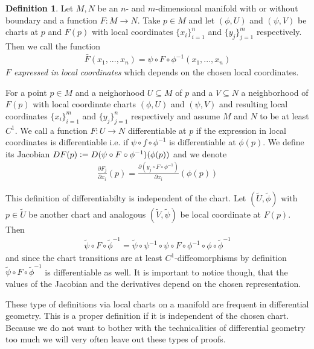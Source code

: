 \documentclass[12pt,a4paper]{article}
\numberwithin{equation}{subsection}
\numberwithin{lemma}{subsection}
\theoremstyle{definition}
\newtheorem{definition}[lemma]{Definition}
\begin{document}
\begin{definition}
    Let $M, N$ be an $n$- and $m$-dimensional manifold with or without boundary 
    and a function $F: M \rightarrow N$. Take $p \in M$ and let $(\phi, U)$ 
    and $(\psi,V)$ be charts at $p$ and $F(p)$ with local 
    coordinates $\{x_i\}_{i=1}^n$ and $\{y_j\}_{j=1}^m$ respectively. 
    Then we call the function 
    \begin{align*}
        \bar{F} (x_1,...,x_n) = \psi \circ F \circ \phi^{-1}(x_1,...,x_n)        
    \end{align*}
    \textit{$F$ expressed in local coordinates} which depends
    on the chosen local coordinates.
\end{definition}

For a point $p \in M$ and a neighorhood $U \subseteq M$ of $p$ and 
a $V \subseteq N$ a neighborhood of $F(p)$ with local coordinate charts 
$(\phi, U)$ and $(\psi, V)$  and resulting local coordinates 
$\{x_i\}_{i=1}^m$ and $\{ y_j\}_{j=1}^n$ respectively and assume 
$M$ and $N$ to be at least $C^1$. We call a function 
$F: U \rightarrow N$ differentiable at $p$ if the expression in local coordinates
is differentiable i.e. if 
$\psi \circ f \circ \phi^{-1}$ is differentiable
at $\phi(p)$.
We define its Jacobian $DF(p) \vcentcolon= D(\psi \circ F \circ \phi^{-1})(\phi(p))$ 
and we denote 
\begin{align}
    \frac{\partial F_j}{\partial x_i}(p) 
    = \frac{\partial (y_j \circ F \circ \phi^{-1})}{\partial x_i} (\phi(p))
    \label{eq:derivative_on_manifold} 
\end{align}

This definition of differentiabilty is independent of the chart. 
Let $(\tilde{U},\tilde{\phi})$ with $p \in \tilde{U}$ be 
another chart and analogous $(\tilde{V},\tilde{\psi})$ be local coordinate 
at $F(p)$.
Then 
\begin{align*}
    \tilde{\psi} \circ F \circ \tilde{\phi}^{-1} 
    = \tilde{\psi} \circ \psi^{-1} \circ \psi \circ F \circ \phi^{-1} \circ \phi \circ \tilde{\phi}^{-1}
\end{align*}
and since the chart transitions are at least $C^1$-diffeomorphisms by definition
$\tilde{\psi} \circ F \circ \tilde{\phi}^{-1} $ is differentiable as well.
It is important to notice though, that the values of the Jacobian 
and the derivatives depend on the chosen representation.

These type of definitions via local charts on a manifold are frequent in
differential geometry. This is a proper definition if it is independent of the 
chosen chart. Because we do not want to bother with the technicalities of 
differential geometry too much we will very often leave out these types of
proofs.  
\end{document}
